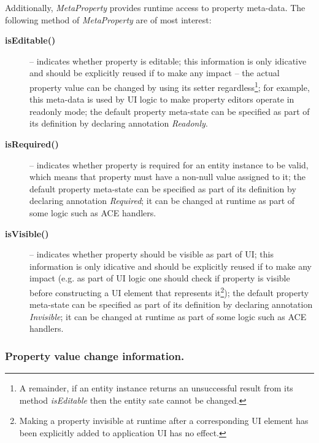   Additionally, \emph{MetaProperty} provides runtime access to property meta-data.
  The following method of \emph{MetaProperty} are of most interest:
  \begin{description}
    \item[\textbf{isEditable()}] -- indicates whether property is editable; this information is only idicative and should be explicitly reused if to make any impact -- the actual property value can be changed by using its setter regardless\footnote{A remainder, if an entity instance returns an unsuccessful result from its method \emph{isEditable} then the entity sate cannot be changed.}; for example, this meta-data is used by UI logic to make property editors operate in readonly mode; the default property meta-state can be specified as part of its definition by declaring annotation \emph{Readonly}.
    \item[\textbf{isRequired()}] -- indicates whether property is required for an entity instance to be valid, which means that property must have a non-null value assigned to it; the default property meta-state can be specified as part of its definition by declaring annotation \emph{Required}; it can be changed at runtime as part of some logic such as ACE handlers.
    \item[\textbf{isVisible()}] -- indicates whether property should be visible as part of UI; this information is only idicative and should be explicitly reused if to make any impact (e.g. as part of UI logic one should check if property is visible before constructing a UI element that represents it\footnote{Making a property invisible at runtime after a corresponding UI element has been explicitly added to application UI has no effect.}); the default property meta-state can be specified as part of its definition by declaring annotation \emph{Invisible}; it can be changed at runtime as part of some logic such as ACE handlers.
  \end{description}  


  \subsubsection*{Property value change information.}
  
